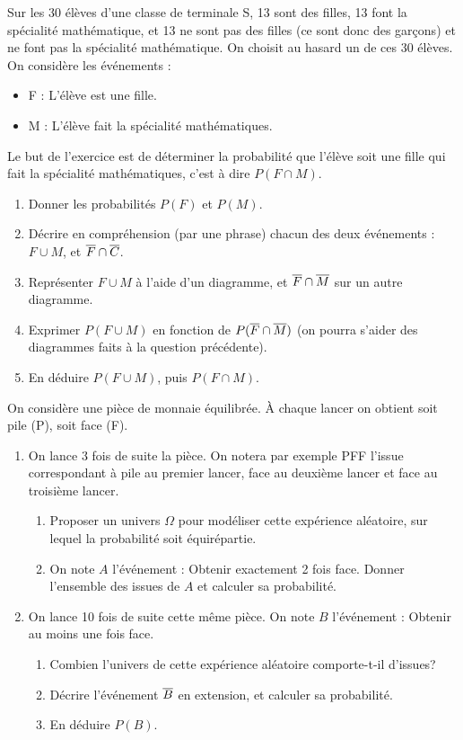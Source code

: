 \documentclass[a4paper,11pt,DIV15,BCOR0mm]{scrartcl}
\begin{document}
{\begin{exercice}
 Sur les 30 élèves d'une classe de terminale S, 13 sont des filles, 13 font la spécialité mathématique, 
et 13 ne sont pas des filles (ce sont donc des garçons) et ne font pas la spécialité mathématique.
On choisit au hasard un de ces 30 élèves. On considère les événements :
\begin{itemize}
 \item F : \og L'élève est une fille\fg.
 \item M : \og L'élève fait la spécialité mathématiques\fg.
\end{itemize}
Le but de l'exercice est de déterminer la probabilité que l'élève soit une fille qui fait la spécialité mathématiques,
c'est à dire $P(F\cap M)$.
\begin{enumerate}
 \item Donner les probabilités $P(F)$ et $P(M)$.
 \item Décrire en compréhension (par une phrase) chacun des deux événements : $F\cup M$, et $\overline{F}\cap\overline{C}$.
 \item Représenter $F\cup M$ à l'aide d'un diagramme, et $\overline{F}\cap\overline{M}$ sur un autre diagramme.
 \item Exprimer $P(F\cup M)$ en fonction de $P(\overline{F}\cap\overline{M})$ (on pourra s'aider des diagrammes faits à la question précédente).
 \item En déduire $P(F\cup M)$, puis $P(F\cap M)$.
\end{enumerate}
\end{exercice}
}


\begin{exercice}
 On  considère une pièce de monnaie équilibrée.
\`A chaque lancer on obtient soit pile (P), soit face (F).
\begin{enumerate}
 \item On lance 3 fois de suite la pièce. On notera par exemple PFF l'issue correspondant à pile au premier lancer, face au deuxième lancer
et face au troisième lancer.
\begin{enumerate}
 \item Proposer un univers $\Omega$ pour modéliser cette expérience aléatoire, sur
 lequel la probabilité soit équirépartie.
 \item On note $A$ l'événement : \og Obtenir exactement 2 fois face\fg. 
Donner l'ensemble des issues de $A$ et calculer sa probabilité.
\end{enumerate}
  \item On lance 10 fois de suite cette même pièce. On note $B$ l'événement : \og Obtenir au moins une fois
face\fg.
\begin{enumerate}
  \item Combien l'univers de cette expérience aléatoire comporte-t-il d'issues?
  \item Décrire l'événement $\overline{B}$ en extension, et calculer sa probabilité.
  \item En déduire $P(B)$.
\end{enumerate}
\end{enumerate}
\end{exercice}
\end{document}

